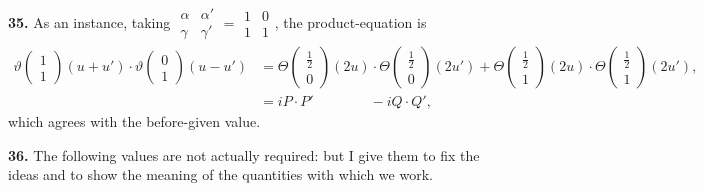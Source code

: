 \documentclass[12pt,a4paper]{article}
\theoremstyle{definition}
\begin{document}
\noindent\textbf{35.}\quad
As an instance, taking $\begin{matrix} \alpha & \alpha' \\ \gamma & \gamma' \end{matrix} = \begin{matrix} 1 & 0 \\ 1 & 1 \end{matrix}$, the product-equation is
\begin{align*}
\vartheta\begin{pmatrix} 1 \\ 1 \end{pmatrix}(u + u') \cdot \vartheta\begin{pmatrix} 0 \\ 1 \end{pmatrix}(u - u') &= \Theta\begin{pmatrix} \tfrac{1}{2} \\ 0 \end{pmatrix}(2u) \cdot \Theta\begin{pmatrix} \tfrac{1}{2} \\ 0 \end{pmatrix}(2u') + \Theta\begin{pmatrix} \tfrac{1}{2} \\ 1 \end{pmatrix}(2u) \cdot \Theta\begin{pmatrix} \tfrac{1}{2} \\ 1 \end{pmatrix}(2u'), \\
&= iP \cdot P' \qquad\qquad - iQ \cdot Q',
\end{align*}
which agrees with the before-given value.

\noindent\textbf{36.}\quad
The following values are not actually required: but I give them to fix the ideas and to show the meaning of the quantities with which we work.
\end{document}
